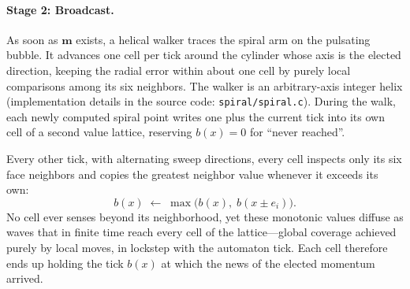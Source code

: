 \documentclass[a4paper]{article}
\begin{document}
\paragraph{Stage 2: Broadcast.}  As soon as $\boldsymbol{m}$ exists, a helical walker traces the spiral arm on the pulsating bubble.  It advances one cell per tick around the cylinder whose axis is the elected direction, keeping the radial error within about one cell by purely local comparisons among its six neighbors.  The walker is an arbitrary-axis integer helix (implementation details in the source code: \texttt{spiral/spiral.c}).  During the walk, each newly computed spiral point writes one plus the current tick into its own cell of a second value lattice, reserving $b(x)=0$ for ``never reached''.

Every other tick, with alternating sweep directions, every cell inspects only its six face neighbors and copies the greatest neighbor value whenever it exceeds its own:
\[
b(x)\;\leftarrow\;\max\bigl(b(x),\;b(x\pm e_i)\bigr).
\]
No cell ever senses beyond its neighborhood, yet these monotonic values diffuse as waves that in finite time reach every cell of the lattice---global coverage achieved purely by local moves, in lockstep with the automaton tick.  Each cell therefore ends up holding the tick $b(x)$ at which the news of the elected momentum arrived.
\end{document}
